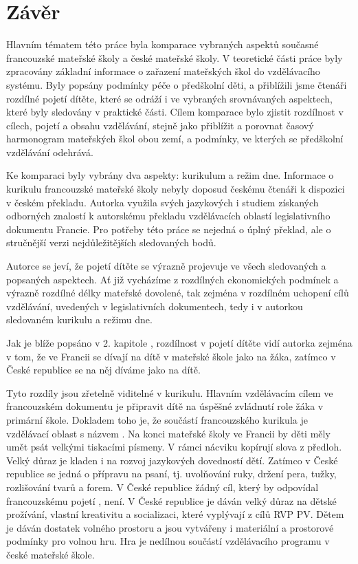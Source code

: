 \chapter*{Závěr}
Hlavním tématem této práce byla komparace vybraných aspektů současné francouzské mateřské školy a české mateřské školy. V teoretické části práce byly zpracovány základní informace o zařazení mateřských škol do vzdělávacího systému. Byly popsány podmínky péče o předškolní děti, a přiblížili jsme čtenáři rozdílné pojetí dítěte, které se odráží i ve vybraných srovnávaných aspektech, které byly sledovány v praktické části. Cílem komparace bylo zjistit rozdílnost v cílech, pojetí a obsahu vzdělávání, stejně jako přiblížit a porovnat časový harmonogram mateřských škol obou zemí, a podmínky, ve kterých se předškolní vzdělávání odehrává.  

Ke komparaci byly vybrány dva aspekty: kurikulum a režim dne. Informace o kurikulu francouzské mateřské školy nebyly doposud českému čtenáři k dispozici v českém překladu. Autorka využila svých jazykových i studiem získaných odborných znalostí k autorskému překladu vzdělávacích oblastí legislativního dokumentu Francie. Pro potřeby této práce se nejedná o úplný překlad, ale o stručnější verzi nejdůležitějších sledovaných bodů. 

Autorce se jeví, že pojetí dítěte se výrazně projevuje ve všech sledovaných a popsaných aspektech. Ať již vycházíme z rozdílných ekonomických podmínek a výrazně rozdílné délky mateřské dovolené, tak zejména v rozdílném uchopení cílů vzdělávání, uvedených v legislativních dokumentech, tedy i v autorkou sledovaném kurikulu a režimu dne. 

Jak je blíže popsáno v 2. kapitole , rozdílnost v pojetí dítěte vidí autorka zejména v tom, že ve Francii se dívají na dítě v mateřské škole jako na žáka, zatímco v České republice se na něj díváme jako na dítě.   

Tyto rozdíly jsou zřetelně viditelné v kurikulu. Hlavním vzdělávacím cílem ve francouzském dokumentu je připravit dítě na úspěšné zvládnutí role žáka v primární škole. Dokladem toho je, že součástí francouzského kurikula je vzdělávací oblast s názvem . Na konci mateřské školy ve Francii by děti měly umět psát velkými tiskacími písmeny. V rámci nácviku kopírují slova z předloh. Velký důraz je kladen i na rozvoj jazykových dovedností dětí. Zatímco v České republice se jedná o přípravu na psaní, tj. uvolňování ruky, držení pera, tužky, rozlišování tvarů a forem. V České republice žádný cíl, který by odpovídal francouzskému pojetí , není. V České republice je dáván velký důraz na dětské prožívání, vlastní kreativitu a socializaci, které vyplývají z cílů RVP PV. Dětem je dáván dostatek volného prostoru a jsou vytvářeny i materiální a prostorové podmínky pro volnou hru. Hra je nedílnou součástí vzdělávacího programu v české mateřské škole. 

